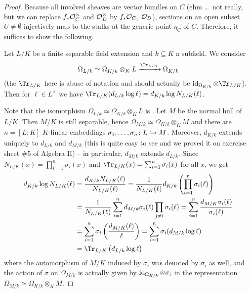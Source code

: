 \documentclass[a4paper,parskip=half,numbers=enddot, DIV=12]{scrreprt}
\begin{document}
\begin{proof}
	Because all involved sheaves are vector bundles on $C$ (ehm \ldots\ not really, but we can replace $f_*\mathcal{O}_C^\times$ and $\mathcal{O}_D^\times$ by $f_*\mathcal{O}_C$, $\mathcal{O}_D$), sections on an open subset $U\neq\emptyset$ injectively map to the stalks at the generic point $\eta_C$ of $C$. Therefore, it suffices to show the following.
	\begin{claim}
		Let $L/K$ be a finite separable field extension and $k\subseteq K$ a subfield. We consider
		\begin{align*}
			\Omega_{L/k}\simeq\Omega_{K/k}\otimes_KL\xrightarrow{\Tr_{L/K}}\Omega_{K/k}
		\end{align*}
		(the $\Tr_{L/K}$ here is abuse of notation and should actually be $\id_{\Omega_{K/k}}\otimes \Tr_{L/K}$). Then for $\ell\in L^\times$ we have $\Tr_{L/K}(d_{L/k}\log \ell)=d_{K/k}\log N_{L/K}(\ell)$.
	\end{claim}
	Note that the isomorphism $\Omega_{L/k}\simeq \Omega_{K/k}\otimes_KL$ is \cite[Lemma~16.15]{eisenbudCommAlg}. Let $M$ be the normal hull of $L/K$. Then $M/K$ is still separable, hence $\Omega_{M/k}\simeq \Omega_{K/k}\otimes_KM$ and there are $n=[L:K]$ $K$-linear embeddings $\sigma_1,\ldots,\sigma_n\colon L\monomorphism M$. Moreover, $d_{K/k}$ extends uniquely to $d_{L/k}$ and $d_{M/k}$ (this is quite easy to see and we proved it on exercise sheet \#5 of Algebra II)  -- in particular, $d_{M/k}$ extends $d_{L/k}$. Since $N_{L/K}(x)=\prod_{i=1}^n\sigma_i(x)$ and $\Tr_{L/K}(x)=\sum_{i=1}^n\sigma_i(x)$ for all $x$, we get
	\begin{align*}
		d_{K/k}\log N_{L/K}(\ell)&=\frac{d_{K/k}N_{L/K}(\ell)}{N_{L/K}(\ell)}=\frac{1}{N_{L/K}(\ell)}d_{K/k}\left(\prod_{i=1}^n\sigma_i(\ell)\right)\\	&=\frac{1}{N_{L/K}(\ell)}\sum_{i=1}^nd_{M/k}\sigma_i(\ell)\prod_{j\neq i}\sigma_i(\ell)=\sum_{i=1}^n\frac{d_{M/K}\sigma_i(\ell)}{\sigma_i(\ell)}\\
		&=\sum_{i=1}^n\sigma_i\left(\frac{d_{M/K}(\ell)}{\ell}\right)=\sum_{i=1}^n\sigma_i(d_{M/k}\log \ell)\\
		&=\Tr_{L/K}\left(d_{L/k}\log\ell\right)
	\end{align*}
	where the automorphism of $M/K$ induced by $\sigma_i$ was denoted by $\sigma_i$ as well, and the action of $\sigma$ on $\Omega_{M/k}$ is actually given by $\operatorname{id}_{\Omega_{K/k}}\otimes \sigma_i$ in the representation $\Omega_{M/k}\simeq \Omega_{K/k}\otimes_KM$.
\end{proof}
\end{document}
